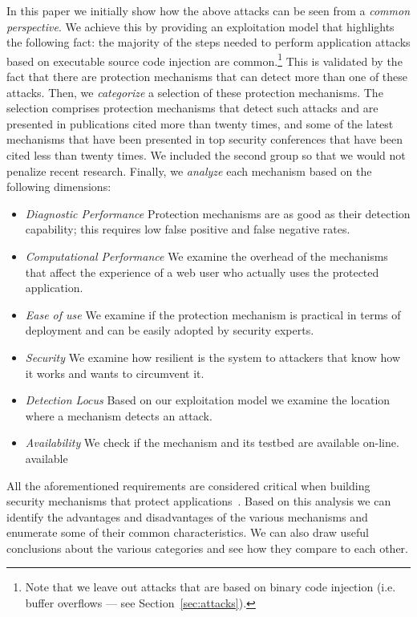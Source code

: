 \documentclass[conference]{IEEEtran}
\begin{document}
In this paper we initially show how the above attacks can be seen from
a {\it common perspective}. We achieve this by providing an
exploitation model that highlights the following fact: the majority of
the steps needed to perform application attacks based on executable
source code injection are common.\footnote{Note that we leave out
  attacks that are based on binary code injection (i.e. buffer
  overflows --- see Section~\ref{sec:attacks}).} This is validated by
the fact that there are protection mechanisms that can detect more
than one of these attacks. Then, we {\it categorize} a selection of
these protection mechanisms. The selection comprises protection
mechanisms that detect such attacks and are presented in publications
cited more than twenty times, and some of the latest mechanisms that
have been presented in top security conferences that have been cited
less than twenty times. We included the second group so that we would
not penalize recent research. Finally, we {\it analyze} each mechanism based
on the following dimensions:
\begin{itemize}
\item {\it Diagnostic Performance} Protection mechanisms are as good
  as their detection capability; this requires low false positive and
  false negative rates.
\item {\it Computational Performance} We examine
  the overhead of the mechanisms
  that affect the experience of a web user who actually
  uses the protected application.
\item {\it Ease of use} We examine if the protection
  mechanism is practical in terms of deployment
  and can be easily adopted by security experts.
\item {\it Security} We examine how resilient is the system to
  attackers that know how it works and wants to circumvent it.
\item {\it Detection Locus} Based on our exploitation model
  we examine the location where a mechanism detects an attack.
\item {\it Availability} We check if the mechanism and its
  testbed are available on-line.
available 
\end{itemize}

\noindent
All the aforementioned requirements are considered critical
when building security mechanisms that protect
applications~\cite{A01,A00,SPWS13,nature2014}.
Based on this analysis we can identify the advantages
and disadvantages of the
various mechanisms and enumerate some of their common
characteristics. We can also draw useful conclusions
about the various categories and see how they compare
to each other.
\end{document}
